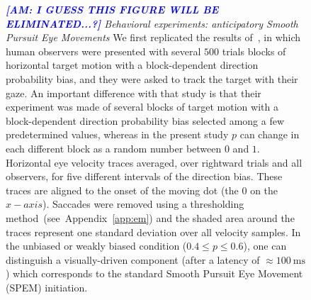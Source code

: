 \documentclass[12pt,english]{article}%
\newcommand{\ms}{\si{\milli\second}}%
\newcommand{\citet}[1]{\textcite{#1}}
\newcommand{\seeFig}[1]{Figure~\ref{fig:#1}}
\newcommand{\seeApp}[1]{Appendix~\ref{app:#1}}
\newcommand{\AM}[1]{\textbf{\textcolor{blue}{[AM: #1]}}}
\begin{document}
\begin{figure}%
\caption{
\emph{\AM{I GUESS THIS FIGURE WILL BE ELIMINATED...?} Behavioral experiments: anticipatory Smooth Pursuit Eye Movements}
We first replicated the results of~\citet{Montagnini2010},
in which human observers were presented with several $500$ trials blocks of horizontal target motion with a block-dependent direction probability bias, and they were asked to track the target with their gaze.
An important difference with that study is that their experiment was made of several blocks of target motion with a block-dependent direction probability bias selected among a few predetermined values, whereas in the present study $p$ can change in each different block as a random number between $0$ and $1$.
Horizontal eye velocity traces
averaged, over rightward trials and all observers, for five different intervals of the direction bias.
These traces are aligned to the onset of the moving dot (the $0$ on the $x-axis$).
Saccades were removed using a thresholding method~(see~\seeApp{em}) and
the shaded area around the traces represent one standard deviation over all velocity samples.
In the unbiased or weakly biased condition ($0.4\leq p\leq 0.6 $), one can distinguish
a visually-driven component (after a latency of $\approx 100~\ms$)
which corresponds to the standard Smooth Pursuit Eye Movement (SPEM) initiation.
}
\end{figure}
\end{document}
